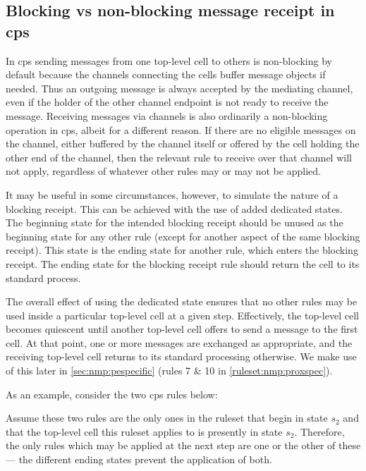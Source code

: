 \subsection{\label{sec:nmp:blocking}Blocking vs non-blocking message receipt in \texorpdfstring{\gls{cps}}{cP systems}}
In \gls{cps} sending messages from one top-level cell to others is non-blocking by default because the channels connecting the cells buffer message objects if needed. Thus an outgoing message is always accepted by the mediating channel, even if the holder of the other channel endpoint is not ready to receive the message.  Receiving messages via channels is also ordinarily a non-blocking operation in \gls{cps}, albeit for a different reason.  If there are no eligible messages on the channel, either buffered by the channel itself or offered by the cell holding the other end of the channel, then the relevant rule to receive over that channel will not apply, regardless of whatever other rules may or may not be applied.

It may be useful in some circumstances, however, to simulate the nature of a blocking receipt.  This can be achieved with the use of added dedicated states.  The beginning state for the intended blocking receipt should be unused as the beginning state for any other rule (except for another aspect of the same blocking receipt).  This state is the ending state for another rule, which enters the blocking receipt.  The ending state for the blocking receipt rule should return the cell to its standard process.

The overall effect of using the dedicated state ensures that no other rules may be used inside a particular top-level cell at a given step.  Effectively, the top-level cell becomes quiescent until another top-level cell offers to send a message to the first cell.  At that point, one or more messages are exchanged as appropriate, and the receiving top-level cell returns to its standard processing otherwise.  We make use of this later in \cref{sec:nmp:pespecific} (rules 7 \& 10 in \cref{ruleset:nmp:proxspec}).

As an example, consider the two \gls{cps} rules below:
\begin{framed}
\vspace{-0.3cm}
\vspace{-0.7cm}
\end{framed}\noindent
Assume these two rules are the only ones in the \gls{ruleset} that begin in state \(s_2\) and that the top-level cell this \gls{ruleset} applies to is presently in state \(s_2\).  Therefore, the only rules which may be applied at the next step are one or the other of these --- the different ending states prevent the application of both.

